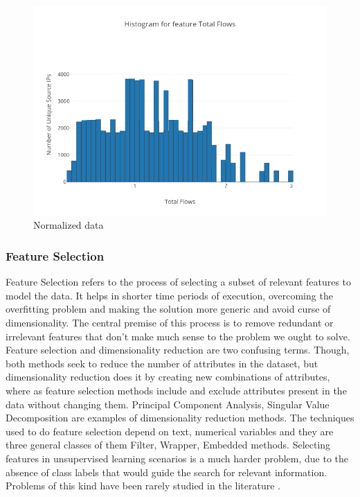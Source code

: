 \begin{figure}[ht]
	\centerline{\includegraphics[scale = 0.9]{transformed.png}}
	\caption{Normalized data}%
\end{figure}



\subsubsection{Feature Selection}		
	
	Feature Selection refers to the process of selecting a subset of relevant features to model the data. It helps in shorter time periods of execution, overcoming the overfitting problem and making the solution more generic and avoid curse of dimensionality. The central premise of this process is to remove redundant or irrelevant features that don't make much sense to the problem we ought to solve. Feature selection and dimensionality reduction are two confusing terms. Though, both methods seek to reduce the number of attributes in the dataset, but dimensionality reduction does it by creating new combinations of attributes, where as feature selection methods include and exclude attributes present in the data without changing them. Principal Component Analysis, Singular Value Decomposition are examples of dimensionality reduction methods. The techniques used to do feature selection depend on text, numerical variables and they are three general classes of them Filter, Wrapper, Embedded methods.	
	Selecting features in unsupervised learning scenarios is a much harder problem, due to the	absence of class labels that would guide the search for relevant information. Problems of
	this kind have been rarely studied in the literature \cite{boutsidis2009unsupervised} \cite{dash2002feature}. 
	
